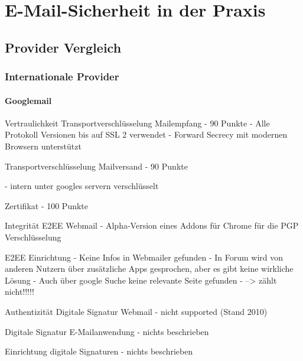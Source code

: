 \documentclass  [paper=a4,
				fontsize=12pt,
				listof=totoc,
				bibliography=totoc
				]{scrreprt}
\begin{document}
	\chapter{E-Mail-Sicherheit in der Praxis}
		\section{Provider Vergleich}
			\subsection{Internationale Provider}
			
			
			
			
			
			\subsubsection*{Googlemail}
			\label{subsubsec:googlemail}
			Vertraulichkeit
			Transportverschlüsselung Mailempfang
			- 90 Punkte
			- Alle Protokoll Versionen bis auf SSL 2 verwendet
			- Forward Secrecy mit modernen Browsern unterstützt
			
			Transportverschlüsselung Mailversand
			- 90 Punkte
			
			- intern unter googles servern verschlüsselt
			
			
			Zertifikat
			- 100 Punkte
			
			Integrität
			E2EE Webmail
			- Alpha-Version eines Addons für Chrome für die PGP Verschlüsselung
			
			
			E2EE Einrichtung
			- Keine Infos in Webmailer gefunden
			- In Forum wird von anderen Nutzern über zusätzliche Apps gesprochen, aber es gibt keine wirkliche Lösung
			- Auch über google Suche keine relevante Seite gefunden
			- --> zählt nicht!!!!!
			
			
			Authentizität
			Digitale Signatur Webmail
			- nicht supported (Stand 2010)
			
			
			Digitale Signatur E-Mailanwendung
			- nichts beschrieben
			
			Einrichtung digitale Signaturen
			- nichts beschrieben
			
\end{document}
